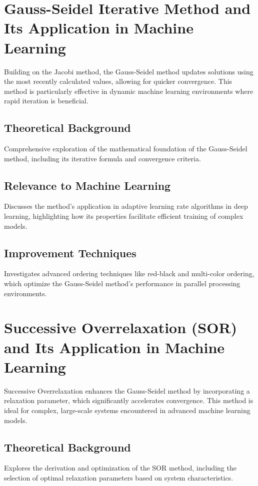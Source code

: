 \documentclass{article}
\begin{document}
\section{Gauss-Seidel Iterative Method and Its Application in Machine Learning}
Building on the Jacobi method, the Gauss-Seidel method updates solutions using the most recently calculated values, allowing for quicker convergence. This method is particularly effective in dynamic machine learning environments where rapid iteration is beneficial.

\subsection{Theoretical Background}
Comprehensive exploration of the mathematical foundation of the Gauss-Seidel method, including its iterative formula and convergence criteria.

\subsection{Relevance to Machine Learning}
Discusses the method's application in adaptive learning rate algorithms in deep learning, highlighting how its properties facilitate efficient training of complex models.

\subsection{Improvement Techniques}
Investigates advanced ordering techniques like red-black and multi-color ordering, which optimize the Gauss-Seidel method's performance in parallel processing environments.

\section{Successive Overrelaxation (SOR) and Its Application in Machine Learning}
Successive Overrelaxation enhances the Gauss-Seidel method by incorporating a relaxation parameter, which significantly accelerates convergence. This method is ideal for complex, large-scale systems encountered in advanced machine learning models.

\subsection{Theoretical Background}
Explores the derivation and optimization of the SOR method, including the selection of optimal relaxation parameters based on system characteristics.
\end{document}
